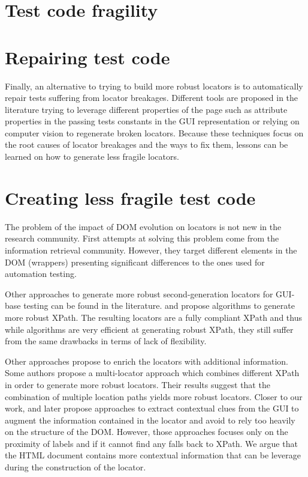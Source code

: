 \section{Test code fragility}

\section{Repairing test code}

Finally, an alternative to trying to build more robust locators is to automatically repair tests suffering from locator breakages. Different tools are proposed in the literature trying to leverage different properties of the page such as attribute properties in the passing tests\cite{Choudhary2011} constants in the GUI representation\cite{Kirinuki2019} or relying on computer vision\cite{Stocco2018} to regenerate broken locators. Because these techniques focus on the root causes of locator breakages and the ways to fix them, lessons can be learned on how to generate less fragile locators.

\section{Creating less fragile test code}

The problem of the impact of DOM evolution on locators is not new in the research community. First attempts at solving this problem come from the information retrieval community\cite{Anton2005, Dalvi2009, Cohen2015}. However, they target different elements in the DOM (wrappers) presenting significant differences to the ones used for automation testing.

Other approaches to generate more robust second-generation locators for GUI-base testing can be found in the literature. \textcite{Leotta2014, Leotta2016} and \textcite{Montoto2011} propose algorithms to generate more robust XPath. The resulting locators are a fully compliant XPath and thus while algorithms are very efficient at generating robust XPath, they still suffer from the same drawbacks in terms of lack of flexibility. 

Other approaches propose to enrich the locators with additional information. Some authors\cite{Leotta2015, Zheng2018} propose a multi-locator approach which combines different XPath in order to generate more robust locators. Their results suggest that the combination of multiple location paths yields more robust locators. Closer to our work, \textcite{Thummalapenta2013} and later \textcite{Yandrapally2014} propose approaches to extract contextual clues from the GUI to augment the information contained in the locator and avoid to rely too heavily on the structure of the DOM. However, those approaches focuses only on the proximity of labels and if it cannot find any falls back to XPath. We argue that the HTML document contains more contextual information that can be leverage during the construction of the locator.